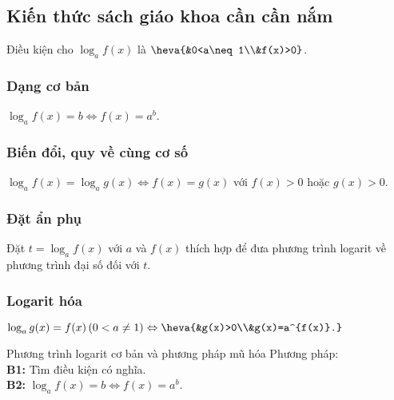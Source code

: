 \subsection{Kiến thức sách giáo khoa cần cần nắm}
Điều kiện cho $\log_af(x)$ là $\heva{&0<a\neq 1\\&f(x)>0}$.
\subsubsection{Dạng cơ bản}
$\log_af(x)=b\Leftrightarrow f(x)=a^b$.
\subsubsection{Biến đổi, quy về cùng cơ số}
$\log_af(x)=\log_ag(x)\Leftrightarrow f(x)=g(x)$ với $f(x)>0$ hoặc $g(x)>0$.
\subsubsection{Đặt ẩn phụ}
Đặt $t=\log_af(x)$ với $a$ và $f(x)$ thích hợp để đưa phương trình logarit về phương trình đại số đối với $t$.
\subsubsection{Logarit hóa}
$\log_ag(x)=f(x)\,(0<a\neq 1)\Leftrightarrow\heva{&g(x)>0\\&g(x)=a^{f(x)}.}$
\begin{dang}{Phương trình logarit cơ bản và phương pháp mũ hóa}
	Phương pháp:\\
	\textbf{B1:} Tìm điều kiện có nghĩa.\\
	\textbf{B2:} $\log_af(x)=b\Leftrightarrow f(x)=a^b$.
\end{dang}
